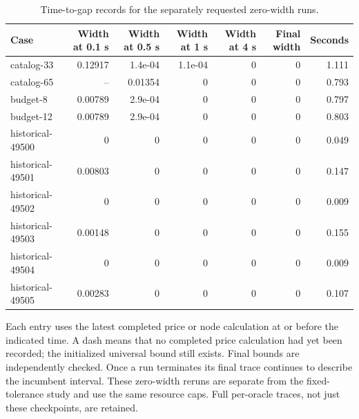 \begin{table}[p]\centering\small\setlength{\tabcolsep}{3pt}
\caption{Time-to-gap records for the separately requested zero-width runs.}\label{tab:anytime54}
\begin{tabular}{lrrrrrr}\toprule
Case & Width at 0.1 s & Width at 0.5 s & Width at 1 s & Width at 4 s & Final width & Seconds\\\midrule
catalog-33 & 0.12917 & 1.4e-04 & 1.1e-04 & 0 & 0 & 1.111\\
catalog-65 & -- & 0.01354 & 0 & 0 & 0 & 0.793\\
budget-8 & 0.00789 & 2.9e-04 & 0 & 0 & 0 & 0.797\\
budget-12 & 0.00789 & 2.9e-04 & 0 & 0 & 0 & 0.803\\
historical-49500 & 0 & 0 & 0 & 0 & 0 & 0.049\\
historical-49501 & 0.00803 & 0 & 0 & 0 & 0 & 0.147\\
historical-49502 & 0 & 0 & 0 & 0 & 0 & 0.009\\
historical-49503 & 0.00148 & 0 & 0 & 0 & 0 & 0.155\\
historical-49504 & 0 & 0 & 0 & 0 & 0 & 0.009\\
historical-49505 & 0.00283 & 0 & 0 & 0 & 0 & 0.107\\
\bottomrule\end{tabular}
\par\smallskip\begin{minipage}{0.98\textwidth}\small Each entry uses the latest completed price or node calculation at or before the indicated time. A dash means that no completed price calculation had yet been recorded; the initialized universal bound still exists. Final bounds are independently checked. Once a run terminates its final trace continues to describe the incumbent interval. These zero-width reruns are separate from the fixed-tolerance study and use the same resource caps. Full per-oracle traces, not just these checkpoints, are retained.\end{minipage}\end{table}\clearpage
